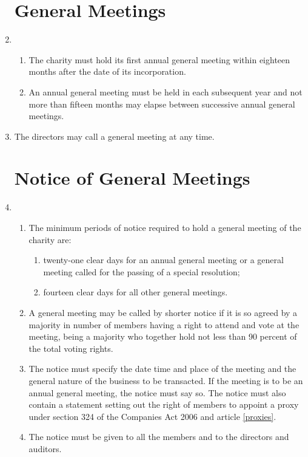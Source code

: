 \begin{enumerate}
\section{General Meetings}

\item
  \begin{enumerate}
  \item
    The charity must hold its first annual general meeting within
    eighteen months after the date of its incorporation.
  \item
    An annual general meeting must be held in each subsequent year and
    not more than fifteen months may elapse between successive annual
    general meetings.
  \end{enumerate}
\item
  The directors may call a general meeting at any time.

\section{Notice of General Meetings}

\item
  \begin{enumerate}
  \item
    The minimum periods of notice required to hold a general meeting of
    the charity are:
    \begin{enumerate}
    \item
      twenty-one clear days for an annual general meeting or a general
      meeting called for the passing of a special resolution;
    \item
      fourteen clear days for all other general meetings.
    \end{enumerate}
  \item
    A general meeting may be called by shorter notice if it is so
    agreed by a majority in number of members having a right to attend
    and vote at the meeting, being a majority who together hold not
    less than 90 percent of the total voting rights.
  \item
    The notice must specify the date time and place of the meeting and
    the general nature of the business to be transacted. If the meeting
    is to be an annual general meeting, the notice must say so. The
    notice must also contain a statement setting out the right of
    members to appoint a proxy under section 324 of the Companies Act
    2006 and article \ref{proxies}.
  \item
    The notice must be given to all the members and to the directors
    and auditors.
  \end{enumerate}


\end{enumerate}
